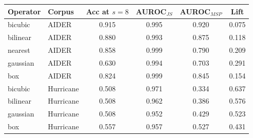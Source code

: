 \begin{tabular}{llcccc}
\toprule
Operator & Corpus & Acc at $s{=}8$ & AUROC$_{JS}$ & AUROC$_{MSP}$ & Lift \\
\midrule
bicubic & AIDER & 0.915 & 0.995 & 0.920 & 0.075\\
bilinear & AIDER & 0.880 & 0.993 & 0.875 & 0.118\\
nearest & AIDER & 0.858 & 0.999 & 0.790 & 0.209\\
gaussian & AIDER & 0.630 & 0.994 & 0.703 & 0.291\\
box & AIDER & 0.824 & 0.999 & 0.845 & 0.154\\
bicubic & Hurricane & 0.508 & 0.971 & 0.334 & 0.637\\
bilinear & Hurricane & 0.508 & 0.962 & 0.386 & 0.576\\
gaussian & Hurricane & 0.508 & 0.952 & 0.429 & 0.523\\
box & Hurricane & 0.557 & 0.957 & 0.527 & 0.431\\
\bottomrule
\end{tabular}
